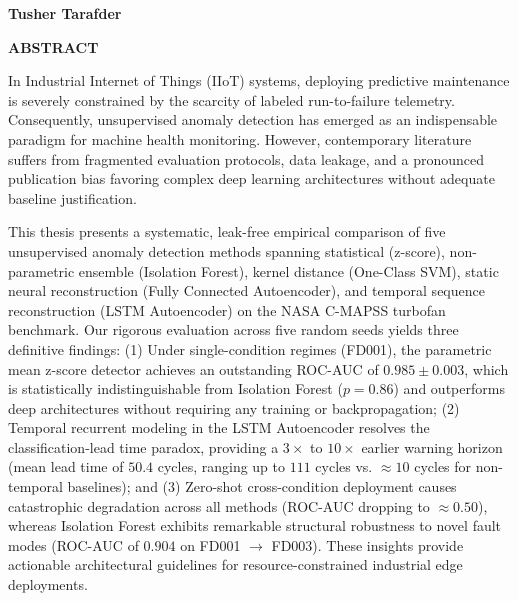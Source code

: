 \documentclass[12pt,a4paper,oneside]{report}
\begin{document}
\vspace{1.5cm}
\begin{flushright}
    \textbf{Tusher Tarafder}
\end{flushright}

\newpage
\thispagestyle{plain}
\begin{center}
    {\LARGE \textbf{ABSTRACT}}\\[1.5cm]
\end{center}

In Industrial Internet of Things (IIoT) systems, deploying predictive maintenance is severely constrained by the scarcity of labeled run-to-failure telemetry. Consequently, unsupervised anomaly detection has emerged as an indispensable paradigm for machine health monitoring. However, contemporary literature suffers from fragmented evaluation protocols, data leakage, and a pronounced publication bias favoring complex deep learning architectures without adequate baseline justification. 

This thesis presents a systematic, leak-free empirical comparison of five unsupervised anomaly detection methods spanning statistical (z-score), non-parametric ensemble (Isolation Forest), kernel distance (One-Class SVM), static neural reconstruction (Fully Connected Autoencoder), and temporal sequence reconstruction (LSTM Autoencoder) on the NASA C-MAPSS turbofan benchmark. Our rigorous evaluation across five random seeds yields three definitive findings: (1) Under single-condition regimes (FD001), the parametric mean z-score detector achieves an outstanding ROC-AUC of $0.985 \pm 0.003$, which is statistically indistinguishable from Isolation Forest ($p = 0.86$) and outperforms deep architectures without requiring any training or backpropagation; (2) Temporal recurrent modeling in the LSTM Autoencoder resolves the classification-lead time paradox, providing a $3\times$ to $10\times$ earlier warning horizon (mean lead time of $50.4$ cycles, ranging up to $111$ cycles vs. $\approx 10$ cycles for non-temporal baselines); and (3) Zero-shot cross-condition deployment causes catastrophic degradation across all methods (ROC-AUC dropping to $\approx 0.50$), whereas Isolation Forest exhibits remarkable structural robustness to novel fault modes (ROC-AUC of $0.904$ on FD001 $\rightarrow$ FD003). These insights provide actionable architectural guidelines for resource-constrained industrial edge deployments.
\end{document}
